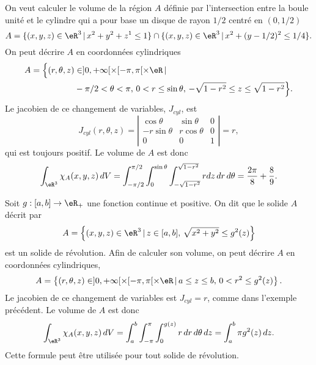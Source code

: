 \begin{example}
	On veut calculer le volume de la région \( A\) définie par  l'intersection entre la boule unité et le cylindre qui a pour base un disque de rayon \( 1/2\) centré en \( (0, 1/2)\)
	\[
		A=\{(x,y,z) \in\eR^3 \,\vert\, x^2+y^2+z^1\leq 1\}\cap\{(x,y,z) \in \eR^3\,\vert\, x^2+(y-1/2)^2\leq 1/4\}.
	\]
	On peut décrire \( A\) en coordonnées cylindriques
	\begin{equation}
		\begin{aligned}
			A=\Big\{(r,\theta,z) & \in ]0, +\infty[\times [-\pi,\pi[\times \eR\,\vert\,                                     \\
			                     & -\pi/2<\theta<\pi, \, 0<r\leq \sin\theta, \, -\sqrt{1-r^2}\leq z\leq\sqrt{1-r^2} \Big\}.
		\end{aligned}
	\end{equation}
	Le jacobien de ce changement de variables,  \( J_{cyl}\), est
	\begin{equation}
		J_{cyl}(r, \theta, z)= \left\vert\begin{array}{ccc}
			\cos \theta   & \sin \theta  & 0 \\
			-r\sin \theta & r\cos \theta & 0 \\
			0             & 0            & 1
		\end{array}\right\vert= r,
	\end{equation}
	qui est toujours positif. Le volume de \( A\) est donc
	\[
		\int_{\eR^3}\chi_{A}(x,y,z)\, dV=\int_{-\pi/2}^{\pi/2}\int_0^{\sin\theta}\int_{-\sqrt{1-r^2}}^{\sqrt{1-r^2}} r dz\,dr\,d\theta=\frac{2\pi}{8}+\frac{8}{9}.
	\]
\end{example}

\begin{example}
	Soit \( g:[a,b]\to\eR_+\) une fonction continue et positive. On dit que le solide \( A\) décrit par
	\[
		A=\left\{(x,y,z)\in\eR^3\, \vert \, z\in[a,b], \,\sqrt{x^2+y^2}\leq g^2(z) \right\}
	\]
	est un solide de révolution. Afin de calculer son volume, on peut décrire \( A\) en coordonnées cylindriques,
	\[
		A=\left\{(r,\theta,z) \in ]0, +\infty[\times [-\pi,\pi[\times \eR\,\vert\, a\leq z\leq b, \, 0<r^2\leq g^2(z) \right\}.
	\]
	Le jacobien de ce changement de variables est  \( J_{cyl}=r\), comme dans l'exemple précédent. Le volume de \( A\) est donc
	\[
		\int_{\eR^3}\chi_{A}(x,y,z)\, dV=\int_a^{b}\int_{-\pi}^{\pi}\int_{0}^{g(z)} r  \,dr\,d\theta\, dz=\int_a^{b} \pi g^2(z) \, dz.
	\]
	Cette formule peut être utilisée pour tout solide de révolution.
\end{example}


